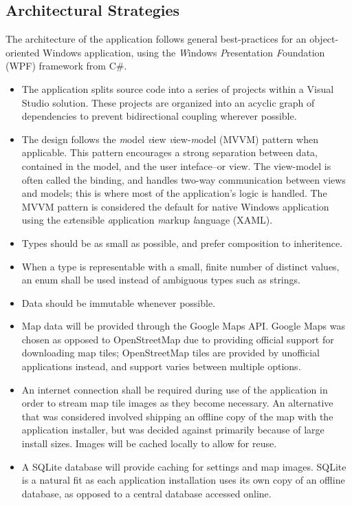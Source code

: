 \documentclass[12pt, letterpaper]{article}
\begin{document}
\subsection{Architectural Strategies}
The architecture of the application follows general best-practices for an object-oriented Windows application,
  using the \emph{W}indows \emph{P}resentation \emph{F}oundation (WPF) framework from C\#.
\begin{itemize}
  \item The application splits source code into a series of projects within a Visual Studio solution.
    These projects are organized into an acyclic graph of dependencies to prevent bidirectional coupling wherever possible.
  \item The design follows the \emph{m}odel \emph{v}iew \emph{v}iew-\emph{m}odel (MVVM) pattern when applicable.
    This pattern encourages a strong separation between data, contained in the model, and the user inteface--or view.
    The view-model is often called the binding, and handles two-way communication between views and models;
    this is where most of the application's logic is handled.
    The MVVM pattern is considered the default for native Windows application using the e\emph{x}tensible \emph{a}pplication \emph{m}arkup \emph{l}anguage (XAML)\cite{msdn_mvvm}.
  \item Types should be as small as possible, and prefer composition to inheritence.
  \item When a type is representable with a small, finite number of distinct values, an enum shall be used instead of ambiguous types such as strings.
  \item Data should be immutable whenever possible.
  \item Map data will be provided through the Google Maps API.
    Google Maps was chosen as opposed to OpenStreetMap due to providing official support for downloading map tiles\cite{gmaps_tiles};
    OpenStreetMap tiles are provided by unofficial applications instead, and support varies between multiple options\cite{osm_tiles}.
  \item An internet connection shall be required during use of the application in order to stream map tile images as they become necessary.
    An alternative that was considered involved shipping an offline copy of the map with the application installer,
    but was decided against primarily because of large install sizes.
    Images will be cached locally to allow for reuse.
  \item A SQLite database will provide caching for settings and map images.
    SQLite is a natural fit as each application installation uses its own copy of an offline database, as opposed to a central database accessed online.
\end{itemize}
\end{document}

